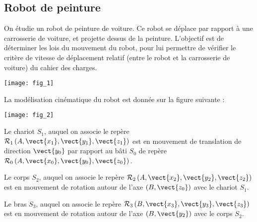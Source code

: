 \ifprof
\else
\begin{multicols}{2}
\fi


\subsection*{Robot de peinture}

\vspace{.25cm}

On étudie un robot de peinture de voiture. Ce robot se déplace par rapport à une carrosserie de voiture, et projette dessus de la peinture. L'objectif est de déterminer les lois du mouvement du robot, pour lui permettre de vérifier le critère de vitesse de déplacement relatif (entre le robot et la carrosserie de voiture) du cahier des charges.

\begin{center}
\texttt{[image: fig\_1]}

\end{center}

\vspace{.25cm}


La modélisation cinématique du robot est donnée sur la figure suivante :


\begin{center}
\texttt{[image: fig\_2]}
\end{center}



\vspace{.25cm}

Le chariot $S_1$, auquel on associe le repère $\mathcal{R}_1\left(A,\vect{x_1},\vect{y_1},\vect{z_1}\right)$ est en mouvement de translation de direction $\vect{y_0}$ par rapport au bâti $S_0$ de repère $\mathcal{R}_0\left(A,\vect{x_0},\vect{y_0},\vect{z_0}\right)$. 

Le corps $S_2$, auquel on associe le repère $\mathcal{R}_2\left(A,\vect{x_2},\vect{y_2},\vect{z_2}\right)$ est en mouvement de rotation autour de l'axe $(B,\vect{z_0})$ avec le chariot $S_1$. 

Le bras $S_3$, auquel on associe le repère $\mathcal{R}_3\left(B,\vect{x_3},\vect{y_3},\vect{z_3}\right)$ est en mouvement de rotation autour de l'axe $(B,\vect{y_2})$ avec le corps $S_2$. 








\end{multicols}
